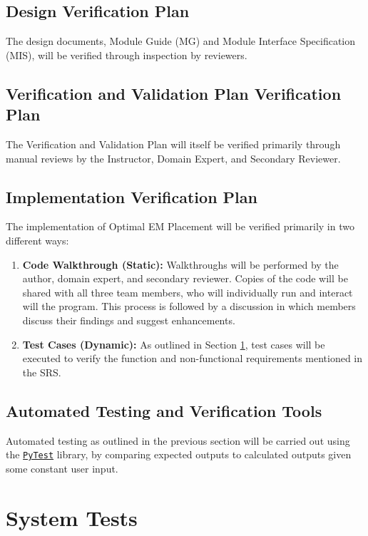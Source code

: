 \documentclass[12pt, titlepage]{article}
\begin{document}
\subsection{Design Verification Plan}
The design documents, Module Guide (MG) and Module Interface Specification (MIS), will be verified through inspection by reviewers. 

\subsection{Verification and Validation Plan Verification Plan}
The Verification and Validation Plan will itself be verified primarily through manual reviews by the Instructor, Domain Expert, and Secondary Reviewer.

\subsection{Implementation Verification Plan}
The implementation of Optimal EM Placement will be verified primarily in two different ways:
\begin{enumerate}
  \item \textbf{Code Walkthrough (Static): }Walkthroughs will be performed by the author, domain expert, and secondary reviewer. Copies of the code will be shared with all three team members, who will individually run and interact will the program. This process is followed by a discussion in which members discuss their findings and suggest enhancements. 
  \item \textbf{Test Cases (Dynamic): }As outlined in Section \ref{sys_tests}, test cases will be executed to verify the function and non-functional requirements mentioned in the SRS. 
\end{enumerate}

\subsection{Automated Testing and Verification Tools} \label{ver_tools}
Automated testing as outlined in the previous section will be carried out using the \href{https://docs.pytest.org/en/stable/}{\texttt{PyTest}} library, by comparing expected outputs to calculated outputs given some constant user input. 

\section{System Tests} \label{sys_tests}
\end{document}
